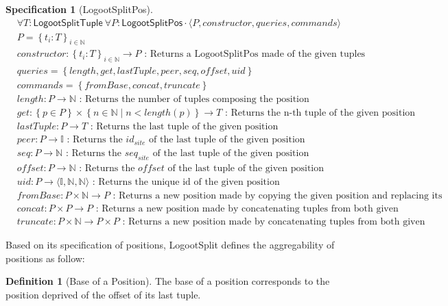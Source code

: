 \documentclass{article}
\newcommand{\commands}[1]{commands = \set{#1}}
\newcommand{\fnspec}[3]{#1: #2 \text{ : #3}}
\newcommand{\inbb}[1]{\in \mathbb{#1}}
\newcommand{\mathlist}[2]{\set{#1_i: #2}_{i \inbb{N}}}
\newcommand{\queries}[1]{queries = \set{#1}}
\newcommand{\set}[1]{\left\{#1\right\}} %
\newcommand{\spectuple}[1]{\tuple{#1, constructor, queries, commands}}
\newcommand{\ssep}{\mid} %
\newcommand{\tuple}[1]{\langle #1 \rangle}
\newcounter{definition-counter}
\theoremstyle{definition}
\newtheorem{definition}[definition-counter]{Definition}
\theoremstyle{definition}
\theoremstyle{definition}
\newcounter{specificationcounter}
\theoremstyle{definition}
\newtheorem{specification}[specificationcounter]{Specification}
\begin{document}
\begin{specification}[LogootSplitPos]
    \begin{align*}
    &\forall T: \mathsf{LogootSplitTuple} \ \forall P: \mathsf{LogootSplitPos} \cdot \spectuple{P}\\
    &P = \mathlist{t}{T}\\
    &\fnspec{constructor}{\mathlist{t}{T} \to P}{Returns a LogootSplitPos made of the given tuples}\\
    &\queries{length, get, lastTuple, peer, seq, offset, uid}\\
    &\commands{fromBase, concat, truncate}\\
    &\fnspec{length}{P \to \mathbb{N}}{Returns the number of tuples composing the position}\\
    &\fnspec{get}{\set{p \in P} \times \set{n \inbb{N} \ssep n < length(p)} \to T}{Returns the n-th tuple of the given position}\\
    &\fnspec{lastTuple}{P \to T}{Returns the last tuple of the given position}\\
    &\fnspec{peer}{P \to \mathbb{I}}{Returns the $id_{site}$ of the last tuple of the given position}\\
    &\fnspec{seq}{P \to \mathbb{N}}{Returns the $seq_{site}$ of the last tuple of the given position}\\
    &\fnspec{offset}{P \to \mathbb{N}}{Returns the $offset$ of the last tuple of the given position}\\
    &\fnspec{uid}{P \to \tuple{\mathbb{I}, \mathbb{N}, \mathbb{N}}}{Returns the unique id of the given position}\\
    &\fnspec{fromBase}{P \times \mathbb{N} \to P}{Returns a new position made by copying the given position and replacing its offset...}\\
    &\fnspec{concat}{P \times P \to P}{Returns a new position made by concatenating tuples from both given positions}\\
    &\fnspec{truncate}{P \times \mathbb{N} \to P \times P}{Returns a new position made by concatenating tuples from both given positions}
    \end{align*}
    \label{spec:logootsplit-pos}
\end{specification}

Based on its specification of positions, LogootSplit defines the aggregability of positions as follow:

\begin{definition}[Base of a Position]
    The base of a position corresponds to the position deprived of the offset of its last tuple.
\end{definition}
\end{document}
